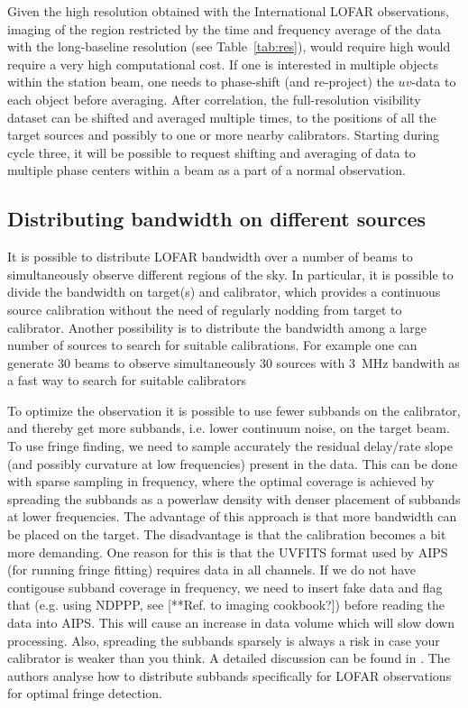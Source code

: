 \documentclass[graybox]{svmult}
\begin{document}
Given the high resolution obtained with the International LOFAR observations,
imaging of the region restricted by the time and frequency average of the data
with the long-baseline resolution (see Table~\ref{tab:res}), would require
high  would require a very high computational cost. If one is interested in
multiple objects within the station beam, one needs to phase-shift (and
re-project) the $uv$-data to each object before averaging. After correlation,
the full-resolution visibility dataset can be shifted and averaged multiple
times, to the positions of all the target sources and possibly to one or more
nearby calibrators. Starting during cycle three, it will be possible to request shifting and averaging of data to multiple phase centers within a
beam as a part of a normal observation.

\subsection{Distributing bandwidth on different sources}\label{sec:bandwidth}

It is possible to distribute LOFAR bandwidth over a number of beams to
simultaneously observe different regions of the sky. In particular, it is
possible to divide the bandwidth on target(s) and calibrator, which provides a
continuous source calibration without the need of regularly nodding from target
to calibrator. Another possibility is to distribute the bandwidth among a large
number of sources to search for suitable calibrations. For example one can
generate 30 beams to observe simultaneously 30 sources with 3~MHz bandwith as a
fast way to search for suitable calibrators \citep[see i.e.][]{moldon14}

To optimize the observation it is possible to use fewer subbands on the
calibrator, and thereby get more subbands, i.e. lower continuum noise, on the
target beam. To use fringe finding, we need to sample accurately the residual
delay/rate slope (and possibly curvature at low frequencies) present in the
data. This can be done with sparse sampling in frequency, where the optimal
coverage is achieved by spreading the subbands as a powerlaw density with
denser placement of subbands at lower frequencies. The advantage of this
approach is that more bandwidth can be placed on the target.  The disadvantage
is that the calibration becomes a bit more demanding. One reason for this is
that the UVFITS format used by AIPS (for running fringe fitting) requires data
in all channels.  If we do not have contigouse subband coverage in frequency,
we need to insert fake data and flag that (e.g. using NDPPP, see [**Ref. to
imaging cookbook?]) before reading the data into AIPS. This will cause an
increase in data volume which will slow down processing. Also, spreading the
subbands sparsely is always a risk in case your calibrator is weaker than you
think. A detailed discussion can be found in \cite{marti-vidal10}. The authors
analyse how to distribute subbands specifically for LOFAR observations for
optimal fringe detection.
\end{document}
